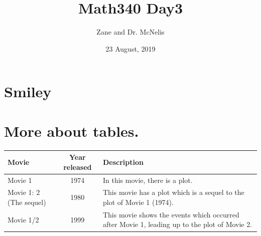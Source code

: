 \documentclass{article}
\title{Math340 Day3}
\author{Zane and Dr. McNelis}
\date{23 August, 2019}
\begin{document}
\maketitle

\section{Smiley}

\Huge{\Smiley}
\huge {\Smiley}

\section{More about tables.}


\normalsize %

\begin{tabular}{|l|c|p{3in}|}
\hline
\textbf{Movie} & \textbf{Year released} & \textbf{Description} \\
\hline
Movie 1 & 1974 & In this movie, there is a plot. \\
Movie 1: 2 (The sequel) & 1980 & This movie has a plot which is a sequel to the plot of Movie 1 (1974). \\
Movie 1/2 & 1999 & This movie shows the events which occurred after Movie 1, leading up to the plot of Movie 2. \\
\hline
\end{tabular}

\vspace{1cm}


\end{document}
